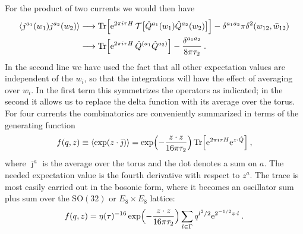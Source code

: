 For the product of two currents we would then have
\begin{align}
	\langle j^{a_1}(w_1)j^{a_2}(w_2)\rangle &\longrightarrow \operatorname{Tr}\Bigl[\mathrm{e}^{2\pi i\tau H}\,\mathcal{T}\bigl[\hat{Q}^{a_1}(w_1)\hat{Q}^{a_2}(w_2)\bigr]\Bigr] - \delta^{a_1 a_2}\pi\delta^2(w_{12},\bar{w}_{12}) \nonumber \\
	&\longrightarrow \operatorname{Tr}\Bigl[\mathrm{e}^{2\pi i\tau H}\,\hat{Q}^{(a_1}\hat{Q}^{a_2)}\Bigr] - \frac{\delta^{a_1 a_2}}{8\pi\tau_2} \:. \label{12.6.13}
\end{align}
In the second line we have used the fact that all other expectation values are independent of the $w_i$, so that the integrations will have the effect of averaging over $w_i$. In the first term this symmetrizes the operators as indicated; in the second it allows us to replace the delta function with its average over the torus. For four currents the combinatorics are conveniently summarized in terms of the generating function
\begin{equation}
	f(q,z) \equiv \langle \exp(z\cdot \bar{\jmath})\rangle = \exp\Bigl(-\frac{z\cdot z}{16\pi\tau_2}\Bigr)\operatorname{Tr}\Bigl[\mathrm{e}^{2\pi i\tau H}\mathrm{e}^{z\cdot \hat{Q}}\Bigr] \:, \label{12.6.14}
\end{equation}
where $\bar{\jmath}^a$ is the average over the torus and the dot denotes a sum on $a$. The needed expectation value is the fourth derivative with respect to $z^a$. The trace is most easily carried out in the bosonic form, where it becomes an oscillator sum plus sum over the $\mathrm{SO}(32)$ or $E_8\times E_8$ lattice:
\begin{equation}
	f(q,z) = \eta(\tau)^{-16}\exp\Bigl(-\frac{z\cdot z}{16\pi\tau_2}\Bigr)\sum_{l\in\Gamma}q^{l^2/2}\mathrm{e}^{2^{-1/2}z\cdot l} \:. \label{12.6.15}
\end{equation}

